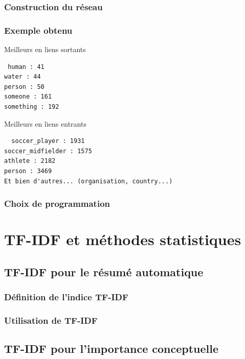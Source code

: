 \documentclass[12pt]{beamer}
\begin{document}
\begin{frame}
 \frametitle{Construction du réseau}
 
 
\end{frame}

\begin{frame}[fragile]
 \frametitle{Exemple obtenu}
 
 \begin{block}{Meilleurs en liens sortants}
 \begin{verbatim}
 human : 41
water : 44
person : 50
someone : 161
something : 192 
\end{verbatim}
 \end{block}

 \begin{block}{Meilleurs en liens entrants}
 \begin{verbatim}
  soccer_player : 1931
soccer_midfielder : 1575
athlete : 2182
person : 3469
Et bien d'autres... (organisation, country...)
\end{verbatim}
 \end{block}

\end{frame}


\begin{frame}
 \frametitle{Choix de programmation}
 
 
\end{frame}


\section{TF-IDF et méthodes statistiques}

\subsection{TF-IDF pour le résumé automatique}

\begin{frame}
 \frametitle{Définition de l'indice TF-IDF}
 
 
\end{frame}

\begin{frame}
 \frametitle{Utilisation de TF-IDF}
 
 
\end{frame}

\subsection{TF-IDF pour l'importance conceptuelle}
\end{document}
